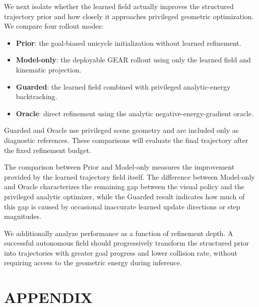 \documentclass[letterpaper, 10 pt, conference]{ieeeconf}  %
\begin{document}
We next isolate whether the learned field actually improves the structured
trajectory prior and how closely it approaches privileged geometric
optimization. We compare four rollout modes:
\begin{itemize}
    \item \textbf{Prior}: the goal-biased unicycle initialization without
    learned refinement.
    \item \textbf{Model-only}: the deployable GEAR rollout using only the
    learned field and kinematic projection.
    \item \textbf{Guarded}: the learned field combined with privileged
    analytic-energy backtracking.
    \item \textbf{Oracle}: direct refinement using the analytic
    negative-energy-gradient oracle.
\end{itemize}

Guarded and Oracle use privileged scene geometry and are included only as
diagnostic references. These comparisons will evaluate the final trajectory
after the fixed refinement budget.

The comparison between Prior and Model-only measures the improvement provided
by the learned trajectory field itself. The difference between Model-only and
Oracle characterizes the remaining gap between the visual policy and the
privileged analytic optimizer, while the Guarded result indicates how much of
this gap is caused by occasional inaccurate learned update directions or step
magnitudes.

We additionally analyze performance as a function of refinement depth. A
successful autonomous field should progressively transform the structured
prior into trajectories with greater goal progress and lower collision rate,
without requiring access to the geometric energy during inference.


\balance







\section*{APPENDIX}
\end{document}
